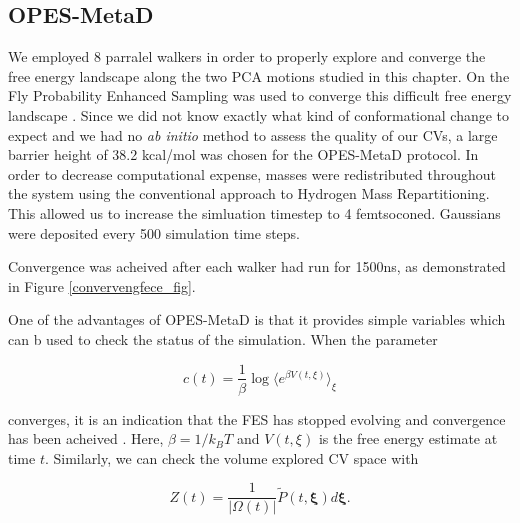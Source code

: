 
\subsection{OPES-MetaD}
We employed 8 parralel walkers in order to properly explore and converge the free energy landscape along the two PCA motions studied in this chapter. On the Fly Probability Enhanced Sampling was used to converge this difficult free energy landscape \cite{}. Since we did not know exactly what kind of conformational change to expect and we had no \textit {ab initio} method to assess the quality of our CVs, a large barrier height of 38.2 kcal/mol was chosen for the OPES-MetaD protocol. In order to decrease computational expense, masses were redistributed throughout the system using the conventional approach to Hydrogen Mass Repartitioning. This allowed us to increase the simluation timestep to 4 femtsoconed. Gaussians were deposited every 500 simulation time steps.

Convergence was acheived after each walker had run for 1500ns, as demonstrated in Figure \ref{convervengfece_fig}. 

One of the advantages of OPES-MetaD is that it provides simple variables which can b used to check the status of the simulation. When the parameter 

\begin{equation}
	c(t) = \frac{1}{\beta} \log \langle e^{\beta V(t,\xi)} \rangle_\xi
\end{equation} 

converges, it is an indication that the FES has stopped evolving and convergence has been acheived \cite{invernizzi2020, tiwary2015}. Here, $\beta=1/k_BT$ and $V(t,\xi)$ is the free energy estimate at time $t$. Similarly, we can check the volume explored CV space with  

\begin{equation}
Z(t) = \frac{1}{| \Omega(t)|}  \tilde{P}(t, \mathbf{\xi}) d\mathbf{\xi}.
\end{equation} 

